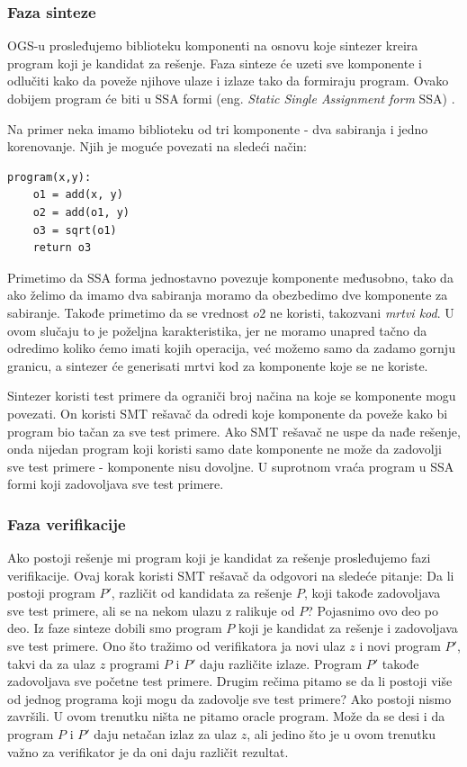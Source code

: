 \subsubsection{Faza sinteze}

OGS-u prosleđujemo biblioteku komponenti na osnovu koje sintezer kreira program koji je kandidat za rešenje. Faza sinteze će uzeti sve komponente i odlučiti kako da poveže njihove ulaze i izlaze tako da formiraju program. Ovako dobijem program će biti u SSA formi (eng. \emph{Static Single Assignment form} SSA) \cite{SSA}.

Na primer neka imamo biblioteku od tri komponente - dva sabiranja i jedno korenovanje. Njih je moguće povezati na sledeći način:

\begin{lstlisting}
program(x,y):
	o1 = add(x, y)
	o2 = add(o1, y)
	o3 = sqrt(o1)
	return o3
\end{lstlisting}

Primetimo da SSA forma jednostavno povezuje komponente me\-đu\-so\-bno, tako da ako želimo da imamo dva sabiranja moramo da obezbedimo dve komponente za sabiranje. Takođe primetimo da se vrednost $o2$ ne koristi, takozvani \emph{mrtvi kod}. U ovom slučaju to je poželjna karakteristika, jer ne moramo unapred tačno da odredimo koliko ćemo imati kojih operacija, već možemo samo da zadamo gornju granicu, a sintezer će generisati mrtvi kod za komponente koje se ne koriste.

Sintezer koristi test primere da ograniči broj načina na koje se komponente mogu povezati. On koristi SMT rešavač da odredi koje komponente da poveže kako bi program bio tačan za sve test primere. Ako SMT rešavač ne uspe da nađe rešenje, onda nijedan program koji koristi samo date komponente ne može da zadovolji sve test primere - komponente nisu dovoljne. U suprotnom vraća program u SSA formi koji zadovoljava sve test primere.


\subsubsection{Faza verifikacije}

Ako postoji rešenje mi program koji je kandidat za rešenje prosleđujemo fazi verifikacije. Ovaj korak koristi SMT rešavač da odgovori na sledeće pitanje: Da li postoji program $P'$, različit od kandidata za rešenje $P$, koji takođe zadovoljava sve test primere, ali se na nekom ulazu z ralikuje od $P$?
Pojasnimo ovo deo po deo. Iz faze sinteze dobili smo program $P$ koji je kandidat za rešenje i zadovoljava sve test primere. Ono što tražimo od verifikatora ja novi ulaz $z$ i novi program $P'$, takvi da za ulaz $z$ programi $P$ i $P'$ daju različite izlaze. Program $P'$ takođe zadovoljava sve početne test primere.
Drugim rečima pitamo se da li postoji više od jednog programa koji mogu da zadovolje sve test primere? Ako postoji nismo završili.
U ovom trenutku ništa ne pitamo oracle program. Može da se desi i da program $P$ i $P'$ daju netačan izlaz za ulaz $z$, ali jedino što je u ovom trenutku važno za verifikator je da oni daju različit rezultat.

